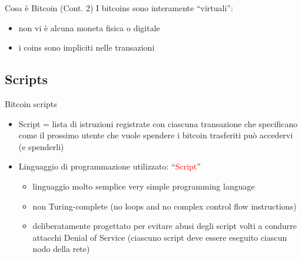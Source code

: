 \documentclass{beamer}
\newcommand\red[1]{\textcolor{red}{#1}}
\begin{document}
  \begin{frame}{Cosa è Bitcoin (Cont. 2)}
    I bitcoins sono interamente ``virtuali'': 
    \begin{itemize}
      \item non vi è alcuna moneta fisica o digitale
      \item i coins sono impliciti nelle transazioni 
    \end{itemize}
  \end{frame}





  \subsection{Scripts}
  \begin{frame}{Bitcoin scripts}
    \begin{itemize}
      \item Script = lista di istruzioni registrate con ciascuna transazione che specificano come il prossimo utente che vuole spendere i bitcoin trasferiti può accedervi (e spenderli) \pause 
      \item Linguaggio di programmazione utilizzato: ``\red{Script}'' \cite{script-bitcoin-wiki} 
      \begin{itemize}
        \item linguaggio molto semplice very simple programming language 
        \item non Turing-complete {\tiny(no loops and no complex control flow instructions)} 
        \item deliberatamente progettato per evitare abusi degli script volti a condurre attacchi Denial of Service {\tiny(ciascuno script deve essere eseguito ciascun nodo della rete)}
      \end{itemize}
    \end{itemize}
  \end{frame}
\end{document}
